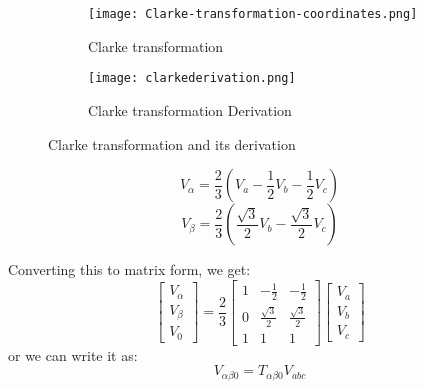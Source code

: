 \begin{figure}[ht]
    \centering
    \begin{subfigure}[b]{0.5\textwidth}
        \centering
        \texttt{[image: Clarke-transformation-coordinates.png]}
        \caption{Clarke transformation}
        \label{fig:Clarke transformation}
    \end{subfigure}%
    \begin{subfigure}[b]{0.5\textwidth}
        \centering
        \texttt{[image: clarkederivation.png]}
        \caption{Clarke transformation Derivation}
        \label{fig:Clarke transformation Derivation}
    \end{subfigure}
    \caption{Clarke transformation and its derivation}
    \label{fig:combined_Clarke}
\end{figure}

\begin{equation*}
    V_\alpha = \frac{2}{3}(V_a - \frac{1}{2} V_b - \frac{1}{2} V_c)
\end{equation*}
\begin{equation*}
    V_\beta = \frac{2}{3}(\frac{\sqrt{3}}{2} V_b - \frac{\sqrt{3}}{2} V_c)
\end{equation*}

\noindent
Converting this to matrix form, we get:
\begin{equation*}
    \begin{bmatrix}
        V_\alpha \\
        V_\beta  \\
        V_0
    \end{bmatrix}
    =\frac{2}{3}
    \begin{bmatrix}
        1 & -\frac{1}{2}       & -\frac{1}{2}       \\
        0 & \frac{\sqrt{3}}{2} & \frac{\sqrt{3}}{2} \\
        1 & 1                  & 1
    \end{bmatrix}
    \begin{bmatrix}
        V_a \\
        V_b \\
        V_c
    \end{bmatrix}
\end{equation*}
\noindent
or we can write it as:
\begin{equation*}
    V_{\alpha\beta0} = T_{\alpha\beta0} V_{abc}
\end{equation*}

